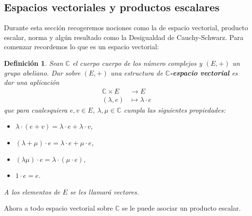 \documentclass[12pt]{article}
\newcommand{\C}{\mathbb{C}}
\theoremstyle{plain}
\newtheorem{definicion}[teorema]{\textbf{Definición}}
\theoremstyle{definition}
\numberwithin{equation}{section}
\begin{document}
    \subsection{Espacios vectoriales y productos escalares}
            Durante esta sección recogeremos nociones como la de espacio vectorial, producto escalar, norma y algún resultado como la Desigualdad de Cauchy-Schwarz.
            Para comenzar recordemos lo que es un espacio vectorial:
            \begin{definicion}
                Sean $\C$ el cuerpo cuerpo de los número complejos y $(E, +)$ un grupo abeliano. Dar sobre $(E, +)$ una estructura de \textbf{$\mathbb{C}$-espacio vectorial} es dar una aplicación
                \begin{equation*}
                    \begin{aligned}
                        \mathbb{C} \times E &\longrightarrow E \\
                        (\lambda, e) &\longmapsto \lambda \cdot e
                    \end{aligned}
                \end{equation*}
                que para cualesquiera $e, v \in E$, $\lambda, \mu \in \mathbb{C}$ cumpla las siguientes propiedades:
                \begin{itemize}
                    \item[(i)] $\lambda \cdot (e + v) = \lambda \cdot e + \lambda \cdot v$,
                    \item[(ii)] $(\lambda + \mu) \cdot e = \lambda \cdot e + \mu \cdot e$,
                    \item[(iii)] $(\lambda\mu) \cdot e = \lambda \cdot (\mu \cdot e)$,
                    \item[(iv)] $1 \cdot e = e$.
                \end{itemize}
                A los elementos de $E$ se les llamará vectores.
            \end{definicion}
            Ahora a todo espacio vectorial sobre \(\C \) se le puede asociar un producto escalar.
\end{document}
